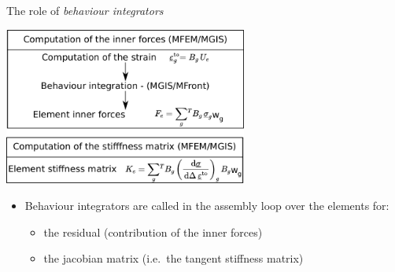\documentclass{beamer}
\providecommand{\tightlist}{%
  \setlength{\itemsep}{0pt}\setlength{\parskip}{0pt}}
\begin{document}
\begin{frame}{The role of \emph{behaviour integrators}}
\protect\hypertarget{the-role-of-behaviour-integrators}{}
\begin{center}
\includegraphics[width=0.6\textwidth]{img/behaviour-integrators.pdf}
\end{center}

\begin{itemize}
\tightlist
\item
  Behaviour integrators are called in the assembly loop over the
  elements for:

  \begin{itemize}
  \tightlist
  \item
    the residual (contribution of the inner forces)
  \item
    the jacobian matrix (i.e.~the tangent stiffness matrix)
  \end{itemize}
\end{itemize}
\end{frame}
\end{document}
